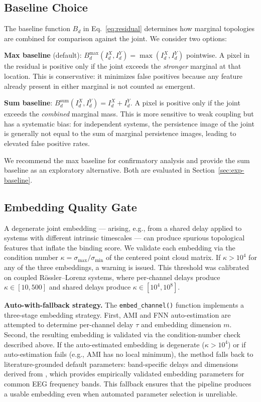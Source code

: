 \documentclass[11pt,a4paper]{article}
\begin{document}
\subsection{Baseline Choice}\label{sec:baseline}

The baseline function $B_d$ in Eq.~\eqref{eq:residual} determines how marginal topologies are combined for comparison against the joint.
We consider two options:

\textbf{Max baseline} (default): $B_d^{\max}(I_d^X, I_d^Y) = \max(I_d^X, I_d^Y)$ pointwise.
A pixel in the residual is positive only if the joint exceeds the \emph{stronger} marginal at that location.
This is conservative: it minimizes false positives because any feature already present in either marginal is not counted as emergent.

\textbf{Sum baseline}: $B_d^{\text{sum}}(I_d^X, I_d^Y) = I_d^X + I_d^Y$.
A pixel is positive only if the joint exceeds the \emph{combined} marginal mass.
This is more sensitive to weak coupling but has a systematic bias: for independent systems, the persistence image of the joint is generally not equal to the sum of marginal persistence images, leading to elevated false positive rates.

We recommend the max baseline for confirmatory analysis and provide the sum baseline as an exploratory alternative.
Both are evaluated in Section~\ref{sec:exp-baseline}.

\subsection{Embedding Quality Gate}\label{sec:quality}

A degenerate joint embedding --- arising, e.g., from a shared delay applied to systems with different intrinsic timescales --- can produce spurious topological features that inflate the binding score.
We validate each embedding via the condition number $\kappa = \sigma_{\max}/\sigma_{\min}$ of the centered point cloud matrix.
If $\kappa > 10^4$ for any of the three embeddings, a warning is issued.
This threshold was calibrated on coupled R\"ossler--Lorenz systems, where per-channel delays produce $\kappa \in [10, 500]$ and shared delays produce $\kappa \in [10^4, 10^8]$.

\textbf{Auto-with-fallback strategy.}
The \texttt{embed\_channel()} function implements a three-stage embedding strategy.
First, AMI and FNN auto-estimation are attempted to determine per-channel delay $\tau$ and embedding dimension $m$.
Second, the resulting embedding is validated via the condition-number check described above.
If the auto-estimated embedding is degenerate ($\kappa > 10^4$) or if auto-estimation fails (e.g., AMI has no local minimum), the method falls back to literature-grounded default parameters: band-specific delays and dimensions derived from \citet{stam2005nonlinear}, which provides empirically validated embedding parameters for common EEG frequency bands.
This fallback ensures that the pipeline produces a usable embedding even when automated parameter selection is unreliable.
\end{document}
